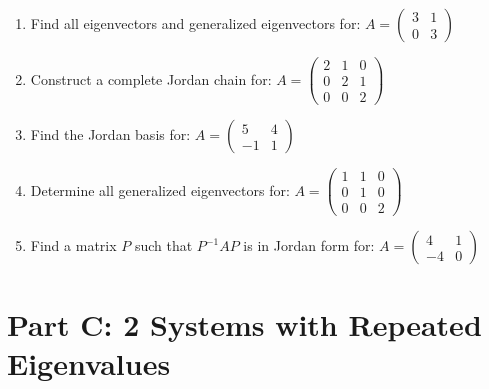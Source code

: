 \documentclass[12pt]{article}
\begin{document}
\begin{enumerate}[start=6]
\item Find all eigenvectors and generalized eigenvectors for:
$A = \begin{pmatrix} 3 & 1 \\ 0 & 3 \end{pmatrix}$

\item Construct a complete Jordan chain for:
$A = \begin{pmatrix} 2 & 1 & 0 \\ 0 & 2 & 1 \\ 0 & 0 & 2 \end{pmatrix}$

\item Find the Jordan basis for:
$A = \begin{pmatrix} 5 & 4 \\ -1 & 1 \end{pmatrix}$

\item Determine all generalized eigenvectors for:
$A = \begin{pmatrix} 1 & 1 & 0 \\ 0 & 1 & 0 \\ 0 & 0 & 2 \end{pmatrix}$

\item Find a matrix $P$ such that $P^{-1}AP$ is in Jordan form for:
$A = \begin{pmatrix} 4 & 1 \\ -4 & 0 \end{pmatrix}$
\end{enumerate}

\section*{Part C: 2 Systems with Repeated Eigenvalues}
\end{document}
